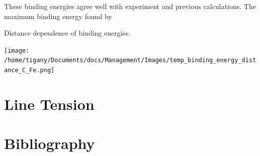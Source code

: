 \documentclass[a4paper]{article}
\begin{document}
These binding energies agree well with experiment and previous calculations. The maximum binding energy found by 


Distance dependence of binding energies. 

\begin{center}
\texttt{[image: /home/tigany/Documents/docs/Management/Images/temp\_binding\_energy\_distance\_C\_Fe.png]}
\end{center}

\section{Line Tension}
\label{sec:orgcae28ae}



\section{Bibliography}
\label{sec:orgfebc9e5}
\label{orgb381ab0}



\end{document}
